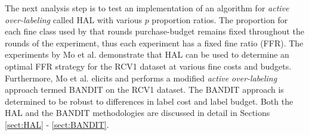 \documentclass[ms]{nuthesis}
\begin{document}

\par The next analysis step is to test an implementation of an algorithm for
 \textit{active over-labeling} called
HAL with various $p$ proportion ratios. The proportion
for each fine class used by that rounds purchase-budget remains fixed throughout the rounds of
the experiment, thus each experiment has a fixed fine ratio (FFR). The experiments by
Mo et al. \cite{yugi} demonstrate that HAL can be used to determine an optimal FFR strategy
for the RCV1 dataset at
various fine costs and budgets. Furthermore, Mo et al. elicits and performs a
modified \textit{active over-labeling} approach termed BANDIT on the RCV1
dataset. The BANDIT approach is determined to be robust to differences in label cost and
label budget. Both the HAL and the BANDIT methodologies are discussed in detail in Sections
\ref{sect:HAL} - \ref{sect:BANDIT}.

%
%
%
%
\end{document}
